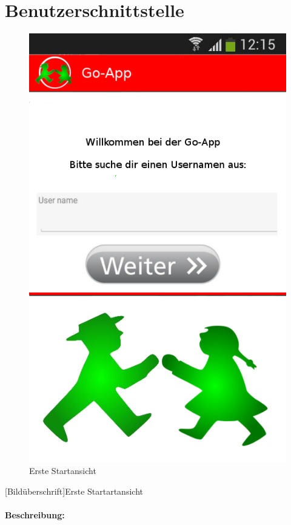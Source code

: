 \section{Benutzerschnittstelle}
\begin{figure} [H]
\caption{Erste Startansicht}
\begin{center}
\includegraphics[scale = 0.5]{resources/images/startansicht.png}
\end{center}

\end{figure}
[Bildüberschrift]Erste Startartansicht\\ \\
\textbf{Beschreibung:}\\
